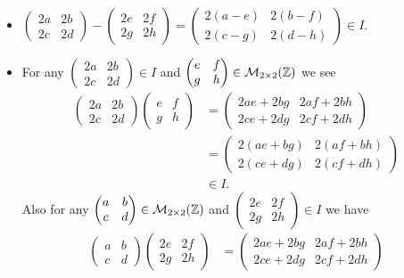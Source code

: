 \begin{questions}
\begin{itemize}
        \item $\begin{pmatrix}2a&2b\\2c&2d\end{pmatrix}-\begin{pmatrix}2e&2f\\2g&2h\end{pmatrix} = \begin{pmatrix}2(a-e)&2(b-f)\\2(c-g)&2(d-h)\end{pmatrix} \in I$.

        \item For any $\begin{pmatrix}2a&2b\\2c&2d\end{pmatrix} \in I$ and $\begin{pmatrix}e&f\\g&h\end{pmatrix} \in \mathcal{M}_{2\times2}(\mathbb{Z})$ we see
        \begin{align*}
            \begin{pmatrix}2a&2b\\2c&2d\end{pmatrix}\begin{pmatrix}e&f\\g&h\end{pmatrix} &= \begin{pmatrix}2ae+2bg&2af+2bh\\2ce+2dg&2cf+2dh\end{pmatrix}\\
            &= \begin{pmatrix}2(ae+bg)&2(af+bh)\\2(ce+dg)&2(cf+dh)\end{pmatrix}\\
            &\in I.
        \end{align*}
        Also for any $\begin{pmatrix}a&b\\c&d\end{pmatrix} \in \mathcal{M}_{2\times2}(\mathbb{Z})$ and $\begin{pmatrix}2e&2f\\2g&2h\end{pmatrix} \in I$ we have
        \begin{align*}
            \begin{pmatrix}a&b\\c&d\end{pmatrix}\begin{pmatrix}2e&2f\\2g&2h\end{pmatrix} &= \begin{pmatrix}2ae+2bg&2af+2bh\\2ce+2dg&2cf+2dh\end{pmatrix}\\

\end{align*}
\end{itemize}
\end{questions}
